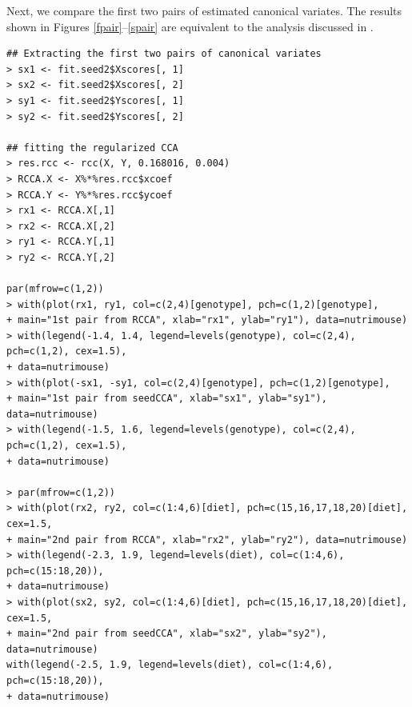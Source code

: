 Next, we compare the first two pairs of estimated canonical variates.
The results shown in Figures \ref{fpair}--\ref{spair} are
equivalent to the analysis discussed in \cite{ecca}.
%
\begin{verbatim}
## Extracting the first two pairs of canonical variates
> sx1 <- fit.seed2$Xscores[, 1]
> sx2 <- fit.seed2$Xscores[, 2]
> sy1 <- fit.seed2$Yscores[, 1]
> sy2 <- fit.seed2$Yscores[, 2]

## fitting the regularized CCA
> res.rcc <- rcc(X, Y, 0.168016, 0.004)
> RCCA.X <- X%*%res.rcc$xcoef
> RCCA.Y <- Y%*%res.rcc$ycoef
> rx1 <- RCCA.X[,1]
> rx2 <- RCCA.X[,2]
> ry1 <- RCCA.Y[,1]
> ry2 <- RCCA.Y[,2]

par(mfrow=c(1,2))
> with(plot(rx1, ry1, col=c(2,4)[genotype], pch=c(1,2)[genotype],
+ main="1st pair from RCCA", xlab="rx1", ylab="ry1"), data=nutrimouse)
> with(legend(-1.4, 1.4, legend=levels(genotype), col=c(2,4), pch=c(1,2), cex=1.5),
+ data=nutrimouse)
> with(plot(-sx1, -sy1, col=c(2,4)[genotype], pch=c(1,2)[genotype],
+ main="1st pair from seedCCA", xlab="sx1", ylab="sy1"), data=nutrimouse)
> with(legend(-1.5, 1.6, legend=levels(genotype), col=c(2,4), pch=c(1,2), cex=1.5),
+ data=nutrimouse)

> par(mfrow=c(1,2))
> with(plot(rx2, ry2, col=c(1:4,6)[diet], pch=c(15,16,17,18,20)[diet], cex=1.5,
+ main="2nd pair from RCCA", xlab="rx2", ylab="ry2"), data=nutrimouse)
> with(legend(-2.3, 1.9, legend=levels(diet), col=c(1:4,6), pch=c(15:18,20)),
+ data=nutrimouse)
> with(plot(sx2, sy2, col=c(1:4,6)[diet], pch=c(15,16,17,18,20)[diet], cex=1.5,
+ main="2nd pair from seedCCA", xlab="sx2", ylab="sy2"), data=nutrimouse)
with(legend(-2.5, 1.9, legend=levels(diet), col=c(1:4,6), pch=c(15:18,20)),
+ data=nutrimouse)
\end{verbatim}

